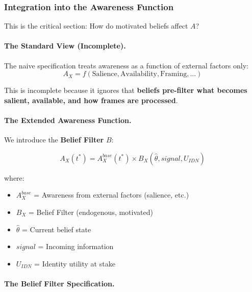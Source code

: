 \subsubsection{Integration into the Awareness Function}
\label{subsubsec:awareness-integration}

This is the critical section: How do motivated beliefs affect $A$?

\paragraph{The Standard View (Incomplete).}
The naive specification treats awareness as a function of external factors only:
\begin{equation}
A_X = f(\text{Salience}, \text{Availability}, \text{Framing}, ...)
\end{equation}

This is incomplete because it ignores that \textbf{beliefs pre-filter what 
becomes salient, available, and how frames are processed}.

\paragraph{The Extended Awareness Function.}
We introduce the \textbf{Belief Filter} $B$:

\begin{equation}
\boxed{
A_X(t^*) = A^{base}_X(t^*) \times B_X(\hat{\theta}, signal, U_{IDN})
}
\label{eq:awareness-belief-filter}
\end{equation}

where:
\begin{itemize}
\item $A^{base}_X$ = Awareness from external factors (salience, etc.)
\item $B_X$ = Belief Filter (endogenous, motivated)
\item $\hat{\theta}$ = Current belief state
\item $signal$ = Incoming information
\item $U_{IDN}$ = Identity utility at stake
\end{itemize}

\paragraph{The Belief Filter Specification.}

